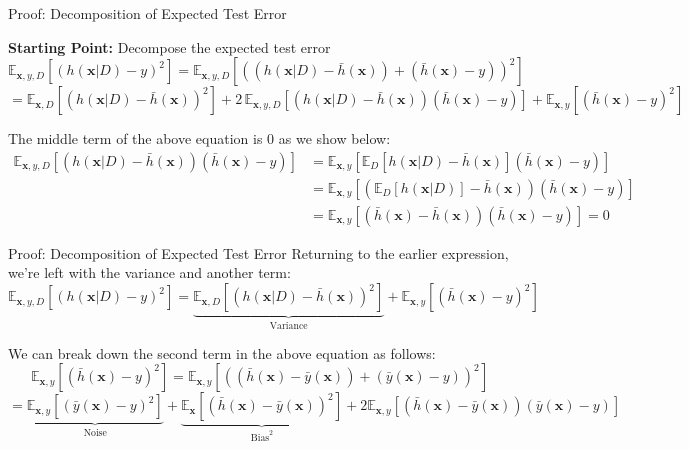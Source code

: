 \documentclass[serif, aspectratio=169]{beamer}
\begin{document}
\begin{frame}{Proof: Decomposition of Expected Test Error}
    
    \vspace{0.6em}
    \textbf{Starting Point:} Decompose the expected test error
    \[
    \mathbb{E}_{\mathbf{x},y,D}\left[\left(h(\mathbf{x} \vert D) - y\right)^2\right] = \mathbb{E}_{\mathbf{x},y,D}\left[\left((h(\mathbf{x} \vert D) - \bar{h}(\mathbf{x})) + (\bar{h}(\mathbf{x}) - y)\right)^2\right]
    \]
    \[
    = \mathbb{E}_{\mathbf{x},D}\left[(h(\mathbf{x} \vert D) - \bar{h}(\mathbf{x}))^2\right] + 2\,\mathbb{E}_{\mathbf{x},y,D}\left[(h(\mathbf{x} \vert D) - \bar{h}(\mathbf{x}))(\bar{h}(\mathbf{x}) - y)\right] + \mathbb{E}_{\mathbf{x},y}\left[(\bar{h}(\mathbf{x}) - y)^2\right]
    \]
    
    The middle term of the above equation is 0 as we show below:
    \begin{align*}
    \mathbb{E}_{\mathbf{x},y,D}\left[(h(\mathbf{x} \vert D) - \bar{h}(\mathbf{x}))(\bar{h}(\mathbf{x}) - y)\right] &= \mathbb{E}_{\mathbf{x},y}\left[\mathbb{E}_D\left[h(\mathbf{x} \vert D) - \bar{h}(\mathbf{x})\right](\bar{h}(\mathbf{x}) - y)\right] \\
    &= \mathbb{E}_{\mathbf{x},y}\left[\left(\mathbb{E}_D[h(\mathbf{x} \vert D)] - \bar{h}(\mathbf{x})\right)(\bar{h}(\mathbf{x}) - y)\right] \\
    &= \mathbb{E}_{\mathbf{x},y}\left[(\bar{h}(\mathbf{x}) - \bar{h}(\mathbf{x}))(\bar{h}(\mathbf{x}) - y)\right] = 0
    \end{align*}
\end{frame}

\begin{frame}{Proof: Decomposition of Expected Test Error}
    Returning to the earlier expression, we're left with the variance and another term:
    \[
    \mathbb{E}_{\mathbf{x},y,D}\left[(h(\mathbf{x} \vert D) - y)^2\right] = \underbrace{\mathbb{E}_{\mathbf{x},D}\left[(h(\mathbf{x} \vert D) - \bar{h}(\mathbf{x}))^2\right]}_{\text{Variance}} + \mathbb{E}_{\mathbf{x},y}\left[(\bar{h}(\mathbf{x}) - y)^2\right]
    \]
    
    We can break down the second term in the above equation as follows:
    \[
    \mathbb{E}_{\mathbf{x},y}\left[(\bar{h}(\mathbf{x}) - y)^2\right] = \mathbb{E}_{\mathbf{x},y}\left[((\bar{h}(\mathbf{x}) - \bar{y}(\mathbf{x})) + (\bar{y}(\mathbf{x}) - y))^2\right]
    \]
    \[
    = \underbrace{\mathbb{E}_{\mathbf{x},y}\left[(\bar{y}(\mathbf{x}) - y)^2\right]}_{\text{Noise}} + \underbrace{\mathbb{E}_{\mathbf{x}}\left[(\bar{h}(\mathbf{x}) - \bar{y}(\mathbf{x}))^2\right]}_{\text{Bias}^2} + 2 \mathbb{E}_{\mathbf{x},y}\left[(\bar{h}(\mathbf{x}) - \bar{y}(\mathbf{x}))(\bar{y}(\mathbf{x}) - y)\right]
    \]
\end{frame}
\end{document}
